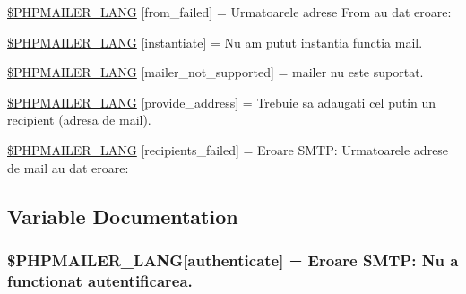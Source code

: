 \begin{DoxyCompactItemize}
\item 
\hyperlink{phpmailer_8lang-ro_8php_adf832ae12155a09be077c6d5e4fd7e22}{\$\+P\+H\+P\+M\+A\+I\+L\+E\+R\+\_\+\+L\+A\+NG} \mbox{[}\textquotesingle{}from\+\_\+failed\textquotesingle{}\mbox{]} = \textquotesingle{}Urmatoarele adrese From au dat eroare\+: \textquotesingle{}
\item 
\hyperlink{phpmailer_8lang-ro_8php_ad58dde16780f4770ccf4dd282ea1f5ad}{\$\+P\+H\+P\+M\+A\+I\+L\+E\+R\+\_\+\+L\+A\+NG} \mbox{[}\textquotesingle{}instantiate\textquotesingle{}\mbox{]} = \textquotesingle{}Nu am putut instantia functia mail.\textquotesingle{}
\item 
\hyperlink{phpmailer_8lang-ro_8php_aa2ebcb8833ee83a7ad67401c4bb3a6ad}{\$\+P\+H\+P\+M\+A\+I\+L\+E\+R\+\_\+\+L\+A\+NG} \mbox{[}\textquotesingle{}mailer\+\_\+not\+\_\+supported\textquotesingle{}\mbox{]} = \textquotesingle{} mailer nu este suportat.\textquotesingle{}
\item 
\hyperlink{phpmailer_8lang-ro_8php_a8b97897c2406b7392b056f375feeefbb}{\$\+P\+H\+P\+M\+A\+I\+L\+E\+R\+\_\+\+L\+A\+NG} \mbox{[}\textquotesingle{}provide\+\_\+address\textquotesingle{}\mbox{]} = \textquotesingle{}Trebuie sa adaugati cel putin un recipient (adresa de mail).\textquotesingle{}
\item 
\hyperlink{phpmailer_8lang-ro_8php_a7589d30bb9b368327c2df015f3e6bcba}{\$\+P\+H\+P\+M\+A\+I\+L\+E\+R\+\_\+\+L\+A\+NG} \mbox{[}\textquotesingle{}recipients\+\_\+failed\textquotesingle{}\mbox{]} = \textquotesingle{}Eroare S\+M\+T\+P\+: Urmatoarele adrese de mail au dat eroare\+: \textquotesingle{}
\end{DoxyCompactItemize}


\subsection{Variable Documentation}
\subsubsection[{\texorpdfstring{\$\+P\+H\+P\+M\+A\+I\+L\+E\+R\+\_\+\+L\+A\+NG}{$PHPMAILER_LANG}}]{\setlength{\rightskip}{0pt plus 5cm}\$P\+H\+P\+M\+A\+I\+L\+E\+R\+\_\+\+L\+A\+NG\mbox{[}\textquotesingle{}authenticate\textquotesingle{}\mbox{]} = \textquotesingle{}Eroare S\+M\+T\+P\+: Nu {\bf a} functionat autentificarea.\textquotesingle{}}\hypertarget{phpmailer_8lang-ro_8php_a2cb33073c989b85580748e331ed8b4aa}{}\label{phpmailer_8lang-ro_8php_a2cb33073c989b85580748e331ed8b4aa}



